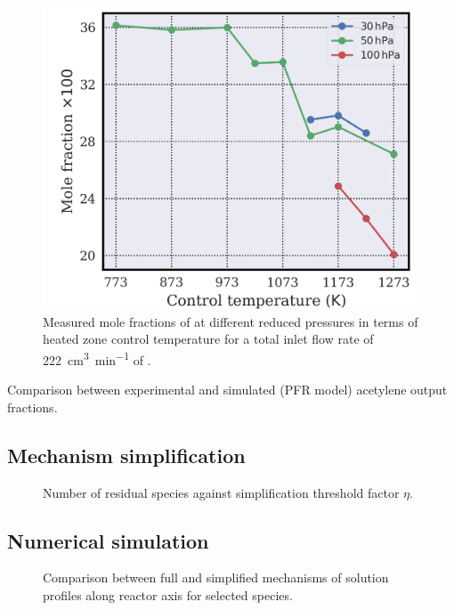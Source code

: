 \documentclass[final,3p,times,twocolumn,sort&compress]{elsarticle}
\begin{document}
\begin{figure}
	\centering
	\includegraphics[width=\linewidth]
	{reworking/fractions_low_pressure}
	\caption{\label{fig:fractions-low-pressure}Measured mole fractions of  at different reduced pressures in terms of heated zone control temperature for a total inlet flow rate of \SI{222}{\cubic\centi\metre\per\minute} of .}
\end{figure}

\begin{table}
	\caption{\label{tab-comparison-sim-exp}Comparison between experimental and simulated (PFR model) acetylene output fractions.}
\end{table}

\subsection{Mechanism simplification}

\begin{figure}
	\caption{\label{fig:simplification-curves}Number of residual species against simplification threshold factor $\eta$.}
\end{figure}

\subsection{Numerical simulation}

\begin{figure}
	\caption{\label{fig:solution comparison}Comparison between full and simplified mechanisms of solution profiles along reactor axis for selected species.}
\end{figure}
\end{document}
